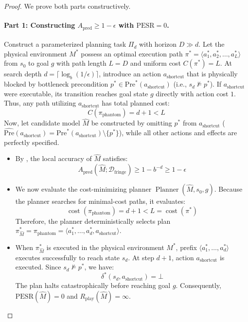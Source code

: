 \documentclass[11pt,a4paper]{article}
\theoremstyle{definition}
\theoremstyle{remark}
\begin{document}
\begin{proof}
We prove both parts constructively.

\paragraph{Part 1: Constructing $A_{\text{pred}} \ge 1 - \epsilon$ with $\text{PESR} = 0$.}
Construct a parameterized planning task $\Pi_d$ with horizon $D \gg d$.
Let the physical environment $M^*$ possess an optimal execution path $\pi^* = \langle a_1^*, a_2^*, \dots, a_L^* \rangle$ from $s_0$ to goal $g$ with path length $L = D$ and uniform cost $C(\pi^*) = L$.
At search depth $d = \lceil \log_b(1/\epsilon) \rceil$, introduce an action $a_{\text{shortcut}}$ that is physically blocked by bottleneck precondition $p^* \in \text{Pre}^*(a_{\text{shortcut}})$ (i.e., $s_d \not\models p^*$).
If $a_{\text{shortcut}}$ were executable, its transition reaches goal state $g$ directly with action cost $1$.
Thus, any path utilizing $a_{\text{shortcut}}$ has total planned cost:
\begin{equation}
    C(\pi_{\text{phantom}}) = d + 1 < L
\end{equation}
Now, let candidate model $\widehat{M}$ be constructed by omitting $p^*$ from $a_{\text{shortcut}}$ ($\widehat{\text{Pre}}(a_{\text{shortcut}}) = \text{Pre}^*(a_{\text{shortcut}}) \setminus \{p^*\}$), while all other actions and effects are perfectly specified.
\begin{itemize}
    \item By , the local accuracy of $\widehat{M}$ satisfies:
    \begin{equation}
        A_{\text{pred}}(\widehat{M}; \mathcal{D}_{\text{fringe}}) \ge 1 - b^{-d} \ge 1 - \epsilon
    \end{equation}
    \item We now evaluate the cost-minimizing planner $\operatorname{Planner}(\widehat{M}, s_0, g)$.
    Because the planner searches for minimal-cost paths, it evaluates:
    \begin{equation}
        \operatorname{cost}(\pi_{\text{phantom}}) = d + 1 < L = \operatorname{cost}(\pi^*)
    \end{equation}
    Therefore, the planner deterministically selects plan $\pi^*_{\widehat{M}} = \pi_{\text{phantom}} = \langle a_1^*, \dots, a_d^*, a_{\text{shortcut}} \rangle$.
    \item When $\pi^*_{\widehat{M}}$ is executed in the physical environment $M^*$, prefix $\langle a_1^*, \dots, a_d^* \rangle$ executes successfully to reach state $s_d$.
    At step $d+1$, action $a_{\text{shortcut}}$ is executed. Since $s_d \not\models p^*$, we have:
    \begin{equation}
        \delta^*(s_d, a_{\text{shortcut}}) = \bot
    \end{equation}
    The plan halts catastrophically before reaching goal $g$.
    Consequently, $\text{PESR}(\widehat{M}) = 0$ and $R_{\text{play}}(\widehat{M}) = \infty$.
\end{itemize}


\end{proof}
\end{document}
